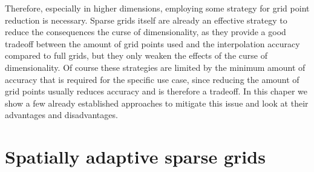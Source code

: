 \documentclass[
  a4paper,  %
  twoside,  %
  bibliography=totoc,
  headsepline,
  cleardoublepage=empty,
  parskip=half,
  draft=false
]{scrbook}
\begin{document}
Therefore, especially in higher dimensions, employing some strategy for grid point reduction is necessary.
Sparse grids itself are already an effective strategy to reduce the consequences the curse of dimensionality, as they provide a good tradeoff between the amount of grid points used and the interpolation accuracy compared to full grids, but they only weaken the effects of the curse of dimensionality.
Of course these strategies are limited by the minimum amount of accuracy that is required for the specific use case, since reducing the amount of grid points usually reduces accuracy and is therefore a tradeoff.
In this chaper we show a few already established approaches to mitigate this issue and look at their advantages and disadvantages.

\section{Spatially adaptive sparse grids}
\end{document}
